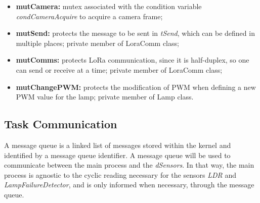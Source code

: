 \begin{itemize}
	\item \textbf{mutCamera:} mutex associated with the condition variable \textit{condCameraAcquire} to acquire a camera frame;
		
	\item \textbf{mutSend:} protects the message to be sent in \textit{tSend}, which can be defined in multiple places; private member of LoraComm class;
	
	\item \textbf{mutComms:} protects LoRa communication, since it is half-duplex, so one can send or receive at a time; private member of LoraComm class;
	
	\item \textbf{mutChangePWM:} protects the modification of PWM when defining a new PWM value for the lamp; private member of Lamp class.
	
\end{itemize}


\subsection{Task Communication}
%
%


A message queue is a linked list of messages stored within the kernel and identified by a message queue identifier. A message queue will be used to communicate between the main process and the \textit{dSensors}. In that way, the main process is agnostic to the cyclic reading necessary for the sensors \textit{LDR} and \textit{LampFailureDetector}, and is only informed when necessary, through the message queue.

%
